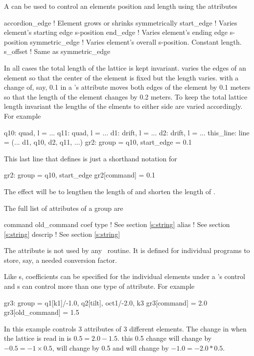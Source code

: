 A  can be used to control an elements position and length using the attributes
\begin{example}
  accordion\_edge  ! Element grows or shrinks symmetrically
  start_edge       ! Varies element's starting edge s-position
  end\_edge        ! Varies element's ending edge s-position
  symmetric\_edge  ! Varies element's overall s-position. Constant length.
  s\_offset        ! Same as symmetric_edge
\end{example}
In all cases the total length of the lattice is kept invariant.
 varies the edges of an element so that the center
of the element is fixed but the length varies. with
 a change of, say, 0.1 in a 's
 attribute moves both edges of the element by 0.1 meters
so that the length of the element changes by 0.2 meters. To keep the
total lattice length invariant the lengths of the elments to either
side are varied accordingly.
For example
\begin{example}
  q10: quad, l = ...
  q11: quad, l = ...
  d1: drift, l = ...
  d2: drift, l = ...
  this\_line: line = (... d1, q10, d2, q11, ...)
  gr2: group = {q10}, start\_edge = 0.1
\end{example}
This last line that defines  is just a shorthand notation for
\begin{example}
  gr2: group = {q10}, start\_edge 
  gr2[command] = 0.1
\end{example}
The effect will be to lengthen the length of  and shorten the
length of .

The full list of attributes of a group are
\begin{example}
  command         
  old\_command     
  coef            
  type            ! See section \ref{s:string}
  alias           ! See section \ref{s:string}
  descrip         ! See section \ref{s:string}
\end{example}
The  attribute is not used by any \bmad\ routine. It is
defined for individual programs to store, say, a needed conversion
factor.

Like s, coefficients can be specified for the individual
elements under a 's control and s can control more
than one type of attribute. For example
\begin{example}
  gr3: group = {q1[k1]/-1.0, q2[tilt], oct1/-2.0}, k3
  gr3[command] = 2.0
  gr3[old_command] = 1.5
\end{example}
In this example  controls 3 attributes of 3 different
elements.  The change in  when the lattice is read in is $0.5
= 2.0 - 1.5$.  this 0.5 change will change  by $-0.5 = -1
\times 0.5$,  will change by 0.5 and  will
change by $-1.0 = -2.0 * 0.5$.






